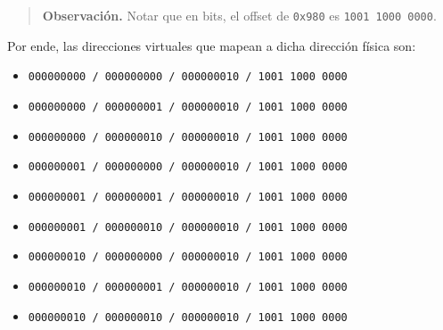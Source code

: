 \documentclass[12pt]{article}
\theoremstyle{definition}
\begin{document}
\small
\begin{quote}

\textbf{Observación.} Notar que en bits, el offset de \texttt{0x980} es
\texttt{1001 1000 0000}.

\end{quote}
\normalsize


Por ende, las direcciones virtuales que mapean a dicha dirección física son:



\begin{itemize}
    \item \texttt{000000000 / 000000000 / 000000010 / 1001 1000 0000}
    \item \texttt{000000000 / 000000001 / 000000010 / 1001 1000 0000}
    \item \texttt{000000000 / 000000010 / 000000010 / 1001 1000 0000}
    \item \texttt{000000001 / 000000000 / 000000010 / 1001 1000 0000}
    \item \texttt{000000001 / 000000001 / 000000010 / 1001 1000 0000}
    \item \texttt{000000001 / 000000010 / 000000010 / 1001 1000 0000}
    \item \texttt{000000010 / 000000000 / 000000010 / 1001 1000 0000}
    \item \texttt{000000010 / 000000001 / 000000010 / 1001 1000 0000}
    \item \texttt{000000010 / 000000010 / 000000010 / 1001 1000 0000}
\end{itemize}
\end{document}

